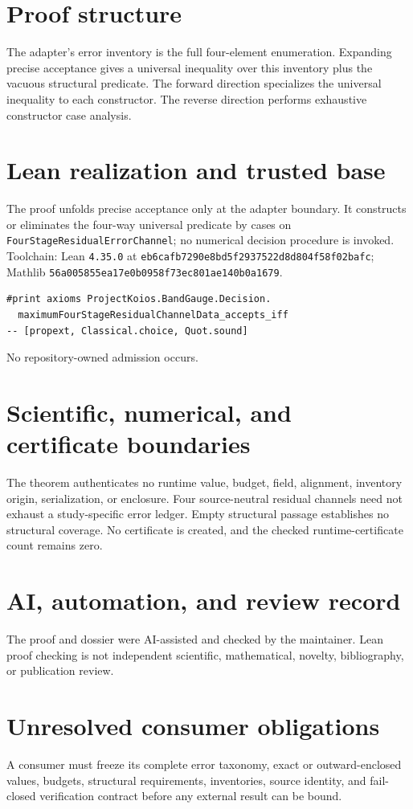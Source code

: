 \documentclass[11pt]{article}
\begin{document}
\section{Proof structure}
The adapter's error inventory is the full four-element enumeration. Expanding precise acceptance gives a universal inequality over this inventory plus the vacuous structural predicate. The forward direction specializes the universal inequality to each constructor. The reverse direction performs exhaustive constructor case analysis.

\section{Lean realization and trusted base}
The proof unfolds precise acceptance only at the adapter boundary. It constructs or eliminates the four-way universal predicate by cases on \texttt{FourStageResidualErrorChannel}; no numerical decision procedure is invoked. Toolchain: Lean \texttt{4.35.0} at \texttt{eb6cafb7290e8bd5f2937522d8d804f58f02bafc}; Mathlib \texttt{56a005855ea17e0b0958f73ec801ae140b0a1679}.
\begin{verbatim}
#print axioms ProjectKoios.BandGauge.Decision.
  maximumFourStageResidualChannelData_accepts_iff
-- [propext, Classical.choice, Quot.sound]
\end{verbatim}
No repository-owned admission occurs.

\section{Scientific, numerical, and certificate boundaries}
The theorem authenticates no runtime value, budget, field, alignment, inventory origin, serialization, or enclosure. Four source-neutral residual channels need not exhaust a study-specific error ledger. Empty structural passage establishes no structural coverage. No certificate is created, and the checked runtime-certificate count remains zero.

\section{AI, automation, and review record}
The proof and dossier were AI-assisted and checked by the maintainer. Lean proof checking is not independent scientific, mathematical, novelty, bibliography, or publication review.

\section{Unresolved consumer obligations}
A consumer must freeze its complete error taxonomy, exact or outward-enclosed values, budgets, structural requirements, inventories, source identity, and fail-closed verification contract before any external result can be bound.
\end{document}
